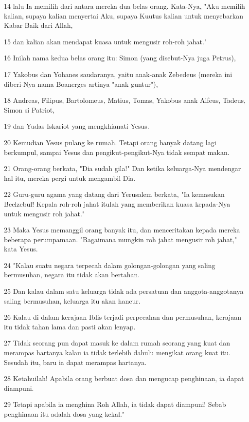 \par 14 lalu Ia memilih dari antara mereka dua belas orang. Kata-Nya, "Aku memilih kalian, supaya kalian menyertai Aku, supaya Kuutus kalian untuk menyebarkan Kabar Baik dari Allah,
\par 15 dan kalian akan mendapat kuasa untuk mengusir roh-roh jahat."
\par 16 Inilah nama kedua belas orang itu: Simon (yang disebut-Nya juga Petrus),
\par 17 Yakobus dan Yohanes saudaranya, yaitu anak-anak Zebedeus (mereka ini diberi-Nya nama Boanerges artinya "anak guntur"),
\par 18 Andreas, Filipus, Bartolomeus, Matius, Tomas, Yakobus anak Alfeus, Tadeus, Simon si Patriot,
\par 19 dan Yudas Iskariot yang mengkhianati Yesus.
\par 20 Kemudian Yesus pulang ke rumah. Tetapi orang banyak datang lagi berkumpul, sampai Yesus dan pengikut-pengikut-Nya tidak sempat makan.
\par 21 Orang-orang berkata, "Dia sudah gila!" Dan ketika keluarga-Nya mendengar hal itu, mereka pergi untuk mengambil Dia.
\par 22 Guru-guru agama yang datang dari Yerusalem berkata, "Ia kemasukan Beelzebul! Kepala roh-roh jahat itulah yang memberikan kuasa kepada-Nya untuk mengusir roh jahat."
\par 23 Maka Yesus memanggil orang banyak itu, dan menceritakan kepada mereka beberapa perumpamaan. "Bagaimana mungkin roh jahat mengusir roh jahat," kata Yesus.
\par 24 "Kalau suatu negara terpecah dalam golongan-golongan yang saling bermusuhan, negara itu tidak akan bertahan.
\par 25 Dan kalau dalam satu keluarga tidak ada persatuan dan anggota-anggotanya saling bermusuhan, keluarga itu akan hancur.
\par 26 Kalau di dalam kerajaan Iblis terjadi perpecahan dan permusuhan, kerajaan itu tidak tahan lama dan pasti akan lenyap.
\par 27 Tidak seorang pun dapat masuk ke dalam rumah seorang yang kuat dan merampas hartanya kalau ia tidak terlebih dahulu mengikat orang kuat itu. Sesudah itu, baru ia dapat merampas hartanya.
\par 28 Ketahuilah! Apabila orang berbuat dosa dan mengucap penghinaan, ia dapat diampuni.
\par 29 Tetapi apabila ia menghina Roh Allah, ia tidak dapat diampuni! Sebab penghinaan itu adalah dosa yang kekal."
